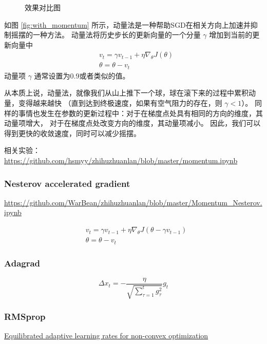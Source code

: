 \begin{figure}[H]
    \caption{效果对比图}
\end{figure}

如图 \ref{fig:with_momentum} 所示，动量法是一种帮助SGD在相关方向上加速并抑制摇摆的一种方法。
动量法将历史步长的更新向量的一个分量 $\gamma$ 增加到当前的更新向量中
\begin{align*}
    & v_t = \gamma v_{t-1} + \eta \nabla_{\theta}{J(\theta)} \\
    & \theta = \theta - v_{t}
\end{align*}
动量项 $\gamma$ 通常设置为0.9或者类似的值。

从本质上说，动量法，就像我们从山上推下一个球，球在滚下来的过程中累积动量，变得越来越快
（直到达到终极速度，如果有空气阻力的存在，则 $\gamma < 1$）。
同样的事情也发生在参数的更新过程中：对于在梯度点处具有相同的方向的维度，其动量项增大，
对于在梯度点处改变方向的维度，其动量项减小。
因此，我们可以得到更快的收敛速度，同时可以减少摇摆。


相关实验：\url{https://github.com/hsmyy/zhihuzhuanlan/blob/master/momentum.ipynb}


\subsubsection{Nesterov accelerated gradient}

\url{https://github.com/WarBean/zhihuzhuanlan/blob/master/Momentum_Nesterov.ipynb}

\begin{align*}
    & v_t = \gamma v_{t-1} + \eta \nabla_{\theta}{J(\theta - \gamma v_{t-1})} \\
    & \theta = \theta - v_{t}
\end{align*}




\subsubsection{Adagrad}

\[
    \Delta x_{t} = -\frac{\eta}{\sqrt{\sum_{\tau = 1}^{t}{g_{\tau}^2}}} g_{t}
\]



\subsubsection{RMSprop}
\href{https://arxiv.org/abs/1502.04390}{Equilibrated adaptive learning rates for non-convex optimization}

